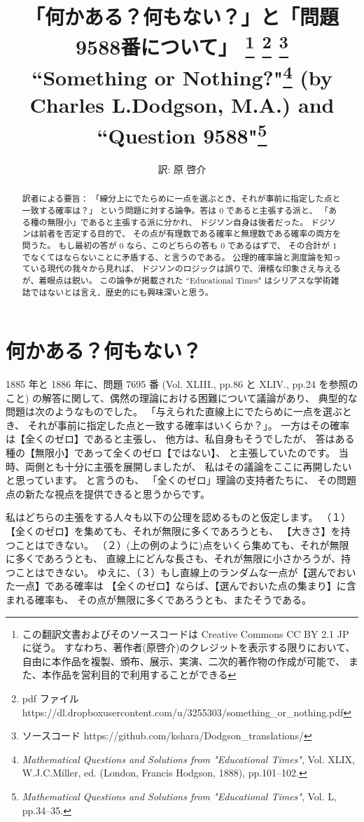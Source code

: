 \documentclass{article}
\title{「何かある？何もない？」と「問題9588番について」
    \footnote{この翻訳文書およびそのソースコードは
    Creative Commons CC BY 2.1 JP に従う。
    すなわち、著作者(原啓介)のクレジットを表示する限りにおいて、
    自由に本作品を複製、頒布、展示、実演、二次的著作物の作成が可能で、
    また、本作品を営利目的で利用することができる}
    \footnote{pdf ファイル https://dl.dropboxusercontent.com/u/3255303/something\_or\_nothing.pdf}
    \footnote{ソースコード https://github.com/kshara/Dodgson\_translations/}
    \\
    \smallskip
    {\large
        ``Something or Nothing?"\footnote{
            {\it Mathematical Questions and Solutions from "Educational Times"},
            Vol. XLIX,
    W.J.C.Miller, ed. (London, Francis Hodgson, 1888), pp.101--102.}
    (by Charles L.Dodgson, M.A.)
    and ``Question 9588"\footnote{
        {\it Mathematical Questions and Solutions from "Educational Times"},
    Vol. L, pp.34--35.}
    }
}
\author{訳: 原 啓介}
\begin{document}
\maketitle

\begin{abstract}
訳者による要旨：
「線分上にでたらめに一点を選ぶとき、それが事前に指定した点と一致する確率は？」
という問題に対する論争。答は $0$ であると主張する派と、
「ある種の無限小」であると主張する派に分かれ、
ドジソン自身は後者だった。
ドジソンは前者を否定する目的で、
その点が有理数である確率と無理数である確率の両方を問うた。
もし最初の答が $0$ なら、このどちらの答も $0$ であるはずで、
その合計が $1$ でなくてはならないことに矛盾する、と言うのである。
公理的確率論と測度論を知っている現代の我々から見れば、
ドジソンのロジックは誤りで、滑稽な印象さえ与えるが、着眼点は鋭い。
この論争が掲載された ``Educational Times"
はシリアスな学術雑誌ではないとは言え、歴史的にも興味深いと思う。
\end{abstract}

\section*{何かある？何もない？}

  1885 年と 1886 年に、問題 7695 番
(Vol. XLIII., pp.86 と XLIV., pp.24 を参照のこと)
の解答に関して、偶然の理論における困難について議論があり、
典型的な問題は次のようなものでした。
「与えられた直線上にでたらめに一点を選ぶとき、
それが事前に指定した点と一致する確率はいくらか？」。
一方はその確率は【全くのゼロ】であると主張し、
他方は、私自身もそうでしたが、
答はある種の【無限小】であって全くのゼロ【ではない】、
と主張していたのです。
当時、両側とも十分に主張を展開しましたが、
私はその議論をここに再開したいと思っています。
と言うのも、
「全くのゼロ」理論の支持者たちに、
その問題点の新たな視点を提供できると思うからです。

 私はどちらの主張をする人々も以下の公理を認めるものと仮定します。
（１）【全くのゼロ】を集めても、それが無限に多くであろうとも、
【大きさ】を持つことはできない。
（２）(上の例のように)点をいくら集めても、それが無限に多くであろうとも、
直線上にどんな長さも、それが無限に小さかろうが、持つことはできない。
ゆえに、（３）もし直線上のランダムな一点が【選んでおいた一点】である確率は
【全くのゼロ】ならば、【選んでおいた点の集まり】に含まれる確率も、
その点が無限に多くであろうとも、またそうである。
\end{document}
